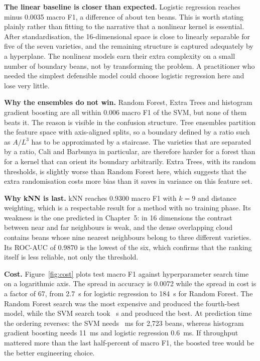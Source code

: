 \textbf{The linear baseline is closer than expected.} Logistic regression reaches
\BestFOne{} minus 0.0035 macro F1, a difference of about ten beans. This is worth
stating plainly rather than fitting to the narrative that a nonlinear kernel is
essential. After standardisation, the 16-dimensional space is close to linearly
separable for five of the seven varieties, and the remaining structure is captured
adequately by a hyperplane. The nonlinear models earn their extra complexity on a
small number of boundary beans, not by transforming the problem. A practitioner
who needed the simplest defensible model could choose logistic regression here and
lose very little.

\textbf{Why the ensembles do not win.} Random Forest, Extra Trees and histogram
gradient boosting are all within 0.006 macro F1 of the SVM, but none of them beats
it. The reason is visible in the confusion structure. Tree ensembles partition the
feature space with axis-aligned splits, so a boundary defined by a ratio such as
$A/L^3$ has to be approximated by a staircase. The varieties that are separated by
a ratio, Cali and Barbunya in particular, are therefore harder for a forest than
for a kernel that can orient its boundary arbitrarily. Extra Trees, with its
random thresholds, is slightly worse than Random Forest here, which suggests that
the extra randomisation costs more bias than it saves in variance on this feature
set.

\textbf{Why kNN is last.} kNN reaches 0.9300 macro F1 with $k = 9$ and distance
weighting, which is a respectable result for a method with no training phase. Its
weakness is the one predicted in Chapter~5: in 16 dimensions the contrast between
near and far neighbours is weak, and the dense overlapping cloud contains beans
whose nine nearest neighbours belong to three different varieties. Its ROC-AUC of
0.9870 is the lowest of the six, which confirms that the ranking itself is less
reliable, not only the threshold.

\textbf{Cost.} Figure~\ref{fig:cost} plots test macro F1 against hyperparameter
search time on a logarithmic axis. The spread in accuracy is 0.0072 while the
spread in cost is a factor of 67, from 2.7~s for logistic regression to 184~s for
Random Forest. The Random Forest search was the most expensive and produced the
fourth-best model, while the SVM search took \BestSearchS{}~s and produced the
best. At prediction time the ordering reverses: the SVM needs
\BestPredictMs{}~ms for 2,723 beans, whereas histogram gradient boosting needs
11~ms and logistic regression 0.6~ms. If throughput mattered more than the last
half-percent of macro F1, the boosted tree would be the better engineering choice.

